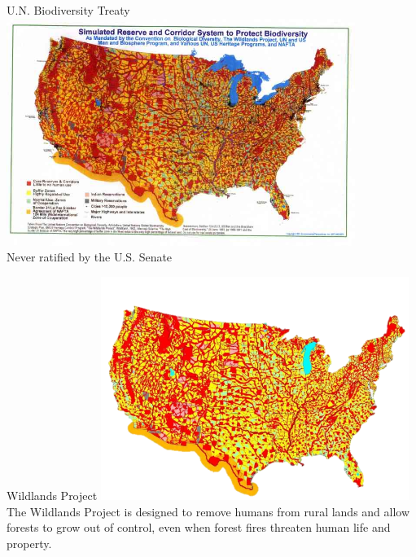 \begin{frame}{U.N. Biodiversity Treaty}
    \centering
    \includegraphics[width=0.85\textwidth]{img/biodiversity.png} \\
    Never ratified by the U.S. Senate \\
\end{frame}

\begin{frame}{Wildlands Project}
    \centering
    \includegraphics[width=0.75\textwidth]{img/wildlands.png} \\
    The Wildlands Project is designed to remove humans from rural lands and allow forests to grow out of control, even when forest fires threaten human life and property. \\
\end{frame}

